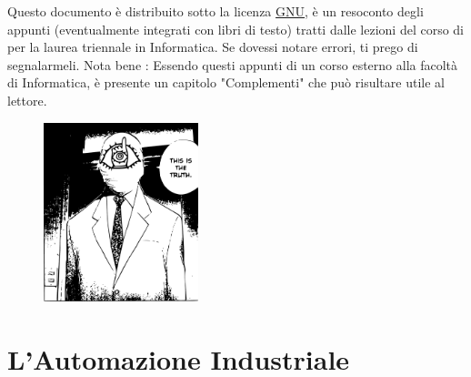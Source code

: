 \documentclass[10pt, letterpaper]{report}
\begin{document}
\newpage
\pagecolor{cartaRiciclata}%
\Large
Questo documento è distribuito sotto la licenza 
\color{blue}\href{https://www.gnu.org/licenses/fdl-1.3.txt}{GNU}\color{black},  
è un resoconto degli appunti (eventualmente integrati con libri di testo) tratti dalle lezioni del corso di \jobname
\hphantom{a}per la laurea 
triennale in Informatica. Se dovessi notare errori, ti prego di segnalarmeli.\acc 
Nota bene : Essendo questi appunti di un corso esterno alla facoltà di Informatica, 
è presente un capitolo "Complementi" che può risultare utile al lettore.
\vfill
\begin{figure}[h!]
    \raggedright
    \includegraphics[width=0.4\textwidth,right ]{../../../preamble/tomodachi.pdf} 
\end{figure}
\newpage %
\normalsize
\tableofcontents 
\newpage

\fancyhf{}
\fancyhead[L]{\nouppercase{\leftmark}}
\fancyfoot[C]{\thepage}


\chapter{L'Automazione Industriale}
\end{document}
